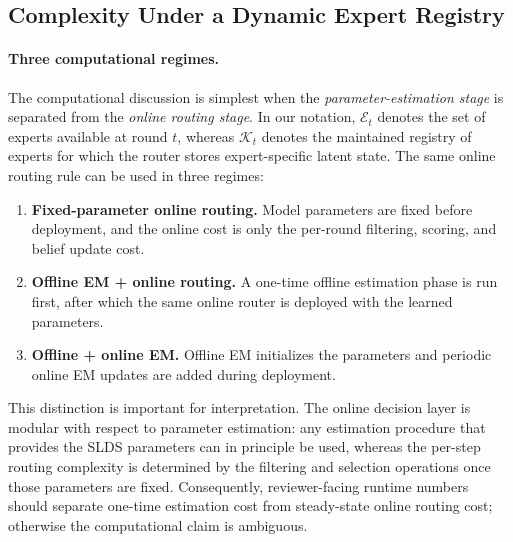 \subsection{Complexity Under a Dynamic Expert Registry}
\label{subsec:complexity_dynamic_registry}

\paragraph{Three computational regimes.}
The computational discussion is simplest when the \emph{parameter-estimation stage} is separated from the \emph{online routing stage}. In our notation, \(\mathcal E_t\) denotes the set of experts available at round \(t\), whereas \(\mathcal K_t\) denotes the maintained registry of experts for which the router stores expert-specific latent state. The same online routing rule can be used in three regimes:
\begin{enumerate}[leftmargin=1.5em]
    \item \textbf{Fixed-parameter online routing.} Model parameters are fixed before deployment, and the online cost is only the per-round filtering, scoring, and belief update cost.
    \item \textbf{Offline EM + online routing.} A one-time offline estimation phase is run first, after which the same online router is deployed with the learned parameters.
    \item \textbf{Offline + online EM.} Offline EM initializes the parameters and periodic online EM updates are added during deployment.
\end{enumerate}
This distinction is important for interpretation. The online decision layer is modular with respect to parameter estimation: any estimation procedure that provides the SLDS parameters can in principle be used, whereas the per-step routing complexity is determined by the filtering and selection operations once those parameters are fixed. Consequently, reviewer-facing runtime numbers should separate one-time estimation cost from steady-state online routing cost; otherwise the computational claim is ambiguous.

